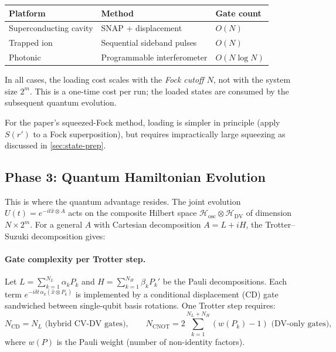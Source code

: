 \documentclass[11pt]{article}
\begin{document}
\begin{center}
\begin{tabular}{lll}
  \toprule
  Platform & Method & Gate count \\
  \midrule
  Superconducting cavity & SNAP + displacement~\cite{heeres2015} & $O(N)$ \\
  Trapped ion & Sequential sideband pulses & $O(N)$ \\
  Photonic & Programmable interferometer & $O(N\log N)$ \\
  \bottomrule
\end{tabular}
\end{center}
In all cases, the loading cost scales with the \emph{Fock cutoff $N$},
not with the system size $2^m$.
This is a one-time cost per run; the loaded states are consumed by the
subsequent quantum evolution.

For the paper's squeezed-Fock method, loading is simpler in principle
(apply $S(r')$ to a Fock superposition), but requires impractically large
squeezing as discussed in \cref{sec:state-prep}.

\subsection{Phase 3: Quantum Hamiltonian Evolution}

This is where the quantum advantage resides.
The joint evolution $U(t)=e^{-it\hat{x}\otimes A}$ acts on the composite
Hilbert space $\mathcal{H}_{\mathrm{osc}} \otimes \mathcal{H}_{\mathrm{DV}}$
of dimension $N \times 2^m$.  For a general $A$ with Cartesian decomposition
$A = L + iH$, the Trotter--Suzuki decomposition gives:

\paragraph{Gate complexity per Trotter step.}
Let $L = \sum_{k=1}^{N_L} \alpha_k P_k$ and $H = \sum_{k=1}^{N_H}\beta_k P_k'$
be the Pauli decompositions.  Each term $e^{-i\delta t\,\alpha_k(\hat{x}\otimes P_k)}$
is implemented by a conditional displacement (CD) gate sandwiched between
single-qubit basis rotations.  One Trotter step requires:
\begin{equation}
  N_{\mathrm{CD}} = N_L \text{ (hybrid CV-DV gates)}, \qquad
  N_{\mathrm{CNOT}} = 2\sum_{k=1}^{N_L+N_H}(w(P_k)-1)
  \text{ (DV-only gates)},
\end{equation}
where $w(P)$ is the Pauli weight (number of non-identity factors).
\end{document}
